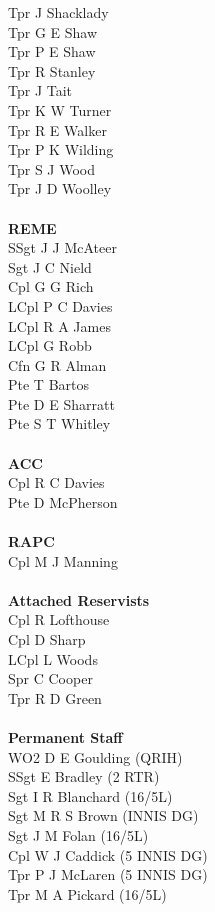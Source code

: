 \begin{multicols}{2}
  Tpr J Shacklady \\
  Tpr G E Shaw \\
  Tpr P E Shaw \\
  Tpr R Stanley \\
  Tpr J Tait \\
  Tpr K W Turner \\
  Tpr R E Walker \\
  Tpr P K Wilding \\
  Tpr S J Wood \\
  Tpr J D Woolley \\
  \\
  \textbf{REME} \\
  SSgt J J McAteer \\
  Sgt J C Nield \\
  Cpl G G Rich \\
  LCpl P C Davies \\
  LCpl R A James \\
  LCpl G Robb \\
  Cfn G R Alman \\
  Pte T Bartos \\
  Pte D E Sharratt \\
  Pte S T Whitley \\
  \\
  \textbf{ACC} \\
  Cpl R C Davies \\
  Pte D McPherson \\
  \\
  \textbf{RAPC} \\
  Cpl M J Manning \\
  \\
  \textbf{Attached Reservists} \\
  Cpl R Lofthouse \\
  Cpl D Sharp \\
  LCpl L Woods \\
  Spr C Cooper \\
  Tpr R D Green \\
  \\
  \textbf{Permanent Staff} \\
  WO2 D E Goulding (QRIH) \\
  SSgt E Bradley (2 RTR) \\
  Sgt I R Blanchard (16/5L) \\
  Sgt M R S Brown (INNIS DG) \\
  Sgt J M Folan (16/5L) \\
  Cpl W J Caddick (5 INNIS DG) \\
  Tpr P J McLaren (5 INNIS DG) \\
  Tpr M A Pickard (16/5L) \\
\end{multicols}
